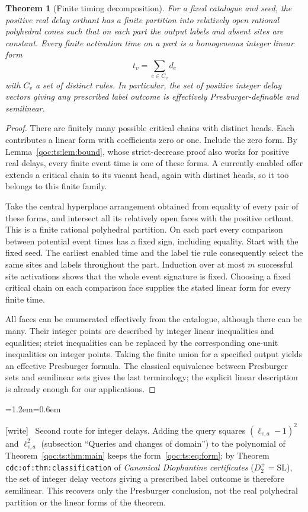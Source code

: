 \documentclass[11pt,letterpaper]{article}
\newtheorem{theorem}{Theorem}[section]
\theoremstyle{definition}
\theoremstyle{remark}
\newcommand{\wtag}{\textup{[write]}}
\newenvironment{writenote}{\par\smallskip\begin{list}{}{\leftmargin=1.2em\rightmargin=0.6em}\item[]\small\wtag\ }{\end{list}\smallskip}
\newcommand{\lab}[1]{\nolinkurl{#1}}
\newcommand{\Dplus}{D^{+}}
\begin{document}
\begin{theorem}[Finite timing decomposition]\label{qoc:ts:thm:phases}
For a fixed catalogue and seed, the positive real delay orthant has a
finite partition into relatively open rational polyhedral cones such that
on each part the output labels and absent sites are constant. Every finite
activation time on a part is a homogeneous integer linear form
\[
 t_v=\sum_{e\in C_v}d_e
\]
with $C_v$ a set of distinct rules. In particular, the set of positive
integer delay vectors giving any prescribed label outcome is effectively
Presburger-definable and semilinear.
\end{theorem}
\begin{proof}
There are finitely many possible critical chains with distinct heads.
Each contributes a linear form with coefficients zero or one. Include
the zero form. By Lemma~\ref{qoc:ts:lem:bound}, whose strict-decrease proof also
works for positive real delays, every finite event time is one of these
forms. A currently enabled offer extends a critical chain to its vacant
head, again with distinct heads, so it too belongs to this finite family.

Take the central hyperplane arrangement obtained from equality of every
pair of these forms, and intersect all its relatively open faces with
the positive orthant. This is a finite rational polyhedral partition.
On each part every comparison between potential event times has a fixed
sign, including equality. Start with the fixed seed. The earliest enabled
time and the label tie rule consequently select the same sites and labels
throughout the part. Induction over at most $m$ successful site activations
shows that the whole event signature is fixed. Choosing a fixed critical
chain on each comparison face supplies the stated linear form for every
finite time.

All faces can be enumerated effectively from the catalogue, although
there can be many. Their integer points are described by integer linear
inequalities and equalities; strict inequalities can be replaced by the
corresponding one-unit inequalities on integer points. Taking the finite
union for a specified output yields an effective Presburger formula.
The classical equivalence between Presburger sets and semilinear sets
\cite{ts:ginsburg} gives
the last terminology; the explicit linear description is already enough
for our applications.
\end{proof}

\begin{writenote}
Second route for integer delays. Adding the query squares $(\ell_{v,a}-1)^2$ and $\ell_{v,a}^2$ (subsection ``Queries and changes of domain'') to the polynomial of Theorem~\ref{qoc:ts:thm:main} keeps the form~\eqref{qoc:ts:eq:form}; by Theorem \lab{cdc:of:thm:classification} of \emph{Canonical Diophantine certificates} ($\Dplus_2=\mathrm{SL}$), the set of integer delay vectors giving a prescribed label outcome is therefore semilinear. This recovers only the Presburger conclusion, not the real polyhedral partition or the linear forms of the theorem.
\end{writenote}
\end{document}
